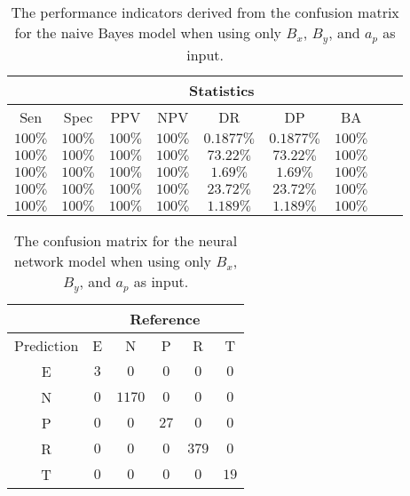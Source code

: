 \begin{table}[!ht]
	\centering
	\begin{tabular}{|c|c|c|c|c|c|c|c|c|}
		\hline
		 & \multicolumn{7}{c|}{Statistics} \\ \hline
		Sen & Spec & PPV & NPV & DR & DP & BA \\ \hline
		$100\%$ & $100\%$ & $100\%$ & $100\%$ & $0.1877\%$ & $0.1877\%$ & $100\%$ \\ \hline
		$100\%$ & $100\%$ & $100\%$ & $100\%$ & $73.22\%$ & $73.22\%$ & $100\%$ \\ \hline
		$100\%$ & $100\%$ & $100\%$ & $100\%$ & $1.69\%$ & $1.69\%$ & $100\%$ \\ \hline
		$100\%$ & $100\%$ & $100\%$ & $100\%$ & $23.72\%$ & $23.72\%$ & $100\%$ \\ \hline
		$100\%$ & $100\%$ & $100\%$ & $100\%$ & $1.189\%$ & $1.189\%$ & $100\%$ \\ \hline
	\end{tabular}
	\caption{The performance indicators derived from the confusion matrix for the naive Bayes model when using only $B_{x}$, $B_{y}$, and $a_{p}$ as input.}
	\label{tab:cs:xyap:nb}
\end{table}

\begin{table}[!ht]
	\centering
	\begin{tabular}{|c|c|c|c|c|c|}
		\hline
		 & \multicolumn{5}{|c|}{Reference} \\ \hline
		 Prediction & E & N & P & R & T \\ \hline
		 E & $3$ & $0$ & $0$ & $0$ & $0$ \\ \hline
		 N & $0$ & $1170$ & $0$ & $0$ & $0$ \\ \hline
		 P & $0$ & $0$ & $27$ & $0$ & $0$ \\ \hline
		 R & $0$ & $0$ & $0$ & $379$ & $0$ \\ \hline
		 T & $0$ & $0$ & $0$ & $0$ & $19$ \\ \hline
	\end{tabular}
	\caption{The confusion matrix for the neural network model when using only $B_{x}$, $B_{y}$, and $a_{p}$ as input.}
	\label{tab:cm:xyap:nnet}
\end{table}

